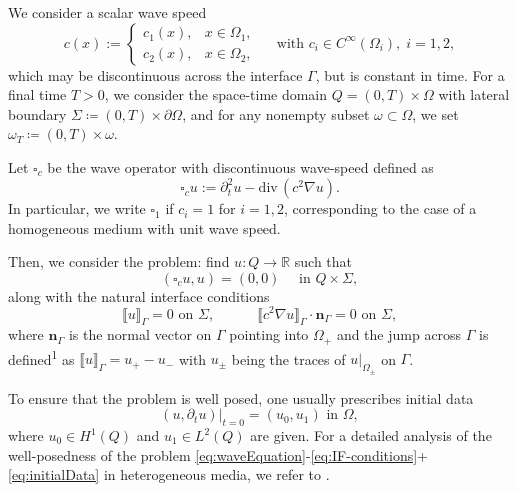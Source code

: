 \documentclass[sn-mathphys-num]{sn-jnl}
\numberwithin{equation}{section}
\newcommand{\jump}[1]{\llbracket#1\rrbracket}
\renewcommand{\div}{\mathrm{div}\,}  %
\newcommand{\wop}{\square_c}
\newcommand{\dt}{\partial_t}
\begin{document}
We consider a scalar wave speed
\[
 c(x) := \begin{cases}
       c_1(x),  & x \in \Omega_1, \\
        c_2(x), & x \in \Omega_2,
    \end{cases}
    \quad 
    \text{ with } c_i \in C^\infty(\Omega_i), \; i = 1,2,
\]
which may be discontinuous across the interface $\Gamma$, but is constant in time. For a final time $T > 0$, we consider the space-time domain $Q = (0,T) \times \Omega$ with lateral boundary $\Sigma \coloneqq (0,T) \times \partial \Omega$, and for any nonempty subset $\omega \subset \Omega$, we set $\omega_T \coloneqq (0,T) \times \omega$. 

Let $\wop$ be the wave operator with discontinuous wave-speed defined as 
\begin{equation*}
    \wop u := \partial_t^2 u - \div(c^2 \nabla u).
\end{equation*}
In particular, we write $\square_1$ if $c_i = 1$ for $i = 1,2$, corresponding to the case of a homogeneous medium with unit wave speed.

Then, we consider the problem: find $u : Q \rightarrow \mathbb{R}$ such that 
\begin{equation}\label{eq:waveEquation}
        (\wop u, u) = (0,0) \quad \text{ in } Q \times \Sigma,
\end{equation}
along with the natural interface conditions 
\begin{equation}\label{eq:IF-conditions}
	\jump{u}_{\Gamma} = 0 \text{ on } \Sigma, \qquad 
	\quad \jump{c^2 \nabla u}_{\Gamma} \cdot \mathbf{n}_{\Gamma} = 0 \text{ on } \Sigma, 
\end{equation}
where $\mathbf{n}_{\Gamma}$ is the normal vector on $\Gamma$ pointing into $\Omega_+$ 
and the jump across $\Gamma$ is defined\textsuperscript{1}\footnotemark {} as $\jump{u}_{\Gamma} = u_{+}-u_{-}$ with $u_{\pm}$ being the traces 
of $u|_{\Omega_{\pm}}$ on $\Gamma$. \par 
To ensure that the problem is well posed, one usually prescribes initial data
\begin{equation}\label{eq:initialData}
    (u,\dt u) \vert_{t = 0} = (u_0,u_1) \text{ in } \Omega, \tag{IVP} 
\end{equation}
where $u_0 \in H^1(Q)$ and $u_1 \in L^2(Q)$ are given. For a detailed analysis of the well-posedness of the problem \eqref{eq:waveEquation}-\eqref{eq:IF-conditions}+\eqref{eq:initialData} in heterogeneous media, we refer to \cite{StolkPhD}. 
\end{document}
